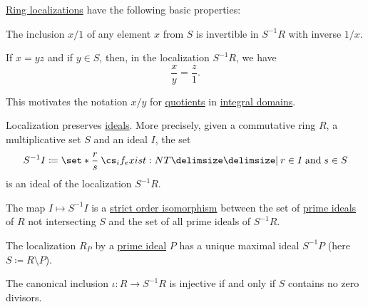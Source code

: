\begin{proposition}\label{thm:def:ring_localization}
  \hyperref[def:ring_localization]{Ring localizations} have the following basic properties:

  \begin{thmenum}
     The inclusion \( x / 1 \) of any element \( x \) from \( S \) is invertible in \( S^{-1} R \) with inverse \( 1 / x \).

     If \( x = yz \) and if \( y \in S \), then, in the localization \( S^{-1} R \), we have
    \begin{equation*}
      \frac x y = \frac z 1.
    \end{equation*}

    This motivates the notation \( x / y \) for \hyperref[def:domain_quotient]{quotients} in \hyperref[def:integral_domain]{integral domains}.

     Localization preserves \hyperref[def:semiring_ideal]{ideals}. More precisely, given a commutative ring \( R \), a multiplicative set \( S \) and an ideal \( I \), the set
    \begin{equation*}
      S^{-1} I \coloneqq \set*{ \frac r s \given* r \in I \T{and} s \in S }
    \end{equation*}
    is an ideal of the localization \( S^{-1} R \).

     The map \( I \mapsto S^{-1} I \) is a \hyperref[def:order_homomorphism/isomorphism]{strict order isomorphism} between the set of \hyperref[def:ring/submodel]{prime ideals} of \( R \) not intersecting \( S \) and the set of all prime ideals of \( S^{-1} R \).

     The localization \( R_P \) by a \hyperref[def:semiring_ideal/prime]{prime ideal} \( P \) has a unique maximal ideal \( S^{-1} P \) (here \( S \coloneqq R \setminus P \)).

     The canonical inclusion \( \iota: R \to S^{-1} R \) is injective if and only if \( S \) contains no zero divisors.
  \end{thmenum}
\end{proposition}
